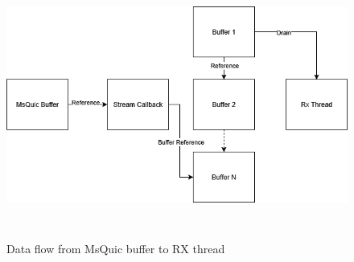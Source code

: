 \documentclass[english, 12pt, a4paper, elec, utf8, a-2b, online]{aaltothesis}
\begin{document}
\begin{figure}[h]
	\centering
	\includegraphics[alt={Block diagram of how the buffer moves from MsQuic to RX thread}, height=8cm]{./images/rx_buf_flow.png}
	\caption{Data flow from MsQuic buffer to RX thread}
	\label{fig:msquic_rx_data}
\end{figure}
\end{document}
